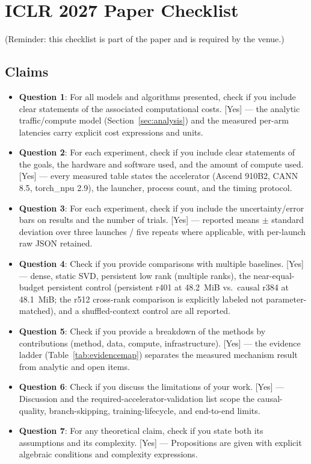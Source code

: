 \section{ICLR 2027 Paper Checklist}
\label{app:paper-checklist}

(Reminder: this checklist is part of the paper and is required by the venue.)

\subsection*{Claims}
\begin{itemize}
  \item \textbf{Question 1}: For all models and algorithms presented, check if you
  include clear statements of the associated computational costs.
  [Yes] — the analytic traffic/compute model (Section~\ref{sec:analysis}) and the
  measured per-arm latencies carry explicit cost expressions and units.
  \item \textbf{Question 2}: For each experiment, check if you include clear
  statements of the goals, the hardware and software used, and the amount of
  compute used.
  [Yes] — every measured table states the accelerator (Ascend 910B2, CANN 8.5,
  torch\_npu 2.9), the launcher, process count, and the timing protocol.
  \item \textbf{Question 3}: For each experiment, check if you include the
  uncertainty/error bars on results and the number of trials.
  [Yes] — reported means $\pm$ standard deviation over three launches /
  five repeats where applicable, with per-launch raw JSON retained.
  \item \textbf{Question 4}: Check if you provide comparisons with multiple
  baselines.
  [Yes] — dense, static SVD, persistent low rank (multiple ranks), the
  near-equal-budget persistent control (persistent r401 at 48.2~MiB vs.\
  causal r384 at 48.1~MiB; the r512 cross-rank comparison is explicitly
  labeled not parameter-matched), and a shuffled-context control are
  all reported.
  \item \textbf{Question 5}: Check if you provide a breakdown of the methods
  by contributions (method, data, compute, infrastructure).
  [Yes] — the evidence ladder (Table~\ref{tab:evidencemap}) separates the
  measured mechanism result from analytic and open items.
  \item \textbf{Question 6}: Check if you discuss the limitations of your work.
  [Yes] — Discussion and the required-accelerator-validation list scope the
  causal-quality, branch-skipping, training-lifecycle, and end-to-end limits.
  \item \textbf{Question 7}: For any theoretical claim, check if you state both
  its assumptions and its complexity.
  [Yes] — Propositions are given with explicit algebraic conditions and
  complexity expressions.
\end{itemize}

